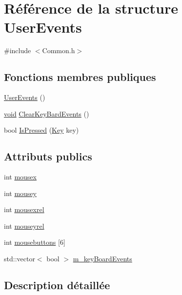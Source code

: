 \hypertarget{struct_user_events}{\section{Référence de la structure User\-Events}
\label{struct_user_events}
}


{\ttfamily \#include $<$Common.\-h$>$}

\subsection*{Fonctions membres publiques}
\begin{DoxyCompactItemize}
\item 
\hyperlink{struct_user_events_a1341f041d246d683bb47a94bc84fe014}{User\-Events} ()
\item 
\hyperlink{glu_8h_a4292190e3f1f6b373a760c7d9316ad3c}{void} \hyperlink{struct_user_events_af6c25d500210883f4fcbca933f3e43bd}{Clear\-Key\-Bard\-Events} ()
\item 
bool \hyperlink{struct_user_events_afb4f5da25004d167889ec30d13f866c4}{Is\-Pressed} (\hyperlink{_common_8h_ab3c7af4820830f9166ede9e5623c4e73}{Key} key)
\end{DoxyCompactItemize}
\subsection*{Attributs publics}
\begin{DoxyCompactItemize}
\item 
int \hyperlink{struct_user_events_a1d974059ccf68a4640fa703063fc7cd8}{mousex}
\item 
int \hyperlink{struct_user_events_a5e19f7d7787b60f3376bfe63f841f1f7}{mousey}
\item 
int \hyperlink{struct_user_events_a35b9f6ad1684725ab2d9dcdbbc715b73}{mousexrel}
\item 
int \hyperlink{struct_user_events_afea18ec7d92eb4348d1f122fbac368aa}{mouseyrel}
\item 
int \hyperlink{struct_user_events_a0f1c058c9fdcdb7af88128178661f8ec}{mousebuttons} \mbox{[}6\mbox{]}
\item 
std\-::vector$<$ bool $>$ \hyperlink{struct_user_events_ae9e99946331657426862610d57e58c3e}{m\-\_\-key\-Board\-Events}
\end{DoxyCompactItemize}


\subsection{Description détaillée}


